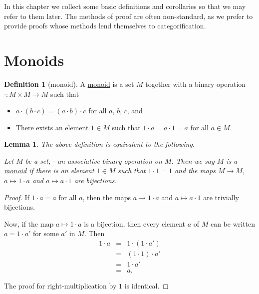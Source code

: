 \documentclass[a4paper,10pt]{scrreprt}
\newcommand{\defn}[1]{\ul{#1}}
\theoremstyle{definition}
\newtheorem{definition}{Definition}[section]
\theoremstyle{plain}
\newtheorem{lemma}{Lemma}[section]
\theoremstyle{remark}
\begin{document}
In this chapter we collect some basic definitions and corollaries so that we may refer to them later. The methods of proof are often non-standard, as we prefer to provide proofs whose methods lend themselves to categorification.
\section{Monoids}
\begin{definition}[monoid]
  \label{def:monoid}
  A \defn{monoid} is a set $M$ together with a binary operation $\cdot\colon M \times M \to M$ such that
  \begin{itemize}
    \item $a \cdot (b \cdot c)=(a \cdot b) \cdot c$ for all $a$, $b$, $c$, and
    \item There exists an element $1 \in M$ such that $1 \cdot a=a \cdot 1=a$ for all $a \in M$.
  \end{itemize}
\end{definition}

\begin{lemma}
  \label{lemma:monoidalmultiplicationbyunitbijective}
  The above definition is equivalent to the following.

  Let $M$ be a set, $\cdot$ an associative binary operation on $M$. Then we say $M$ is a \defn{monoid} if there is an element $1 \in M$ such that $1\cdot 1 = 1$ and the maps $M \to M$, $a \mapsto 1 \cdot a$ and $ a \mapsto a \cdot 1$ are bijections.
\end{lemma}
\begin{proof}
  If $1 \cdot a = a$ for all $a$, then the maps $a \to 1\cdot a$ and $a \mapsto a \cdot 1$ are trivially bijections.

  Now, if the map $a \mapsto 1 \cdot a$ is a bijection, then every element $a$ of $M$ can be written $a = 1 \cdot a'$ for some $a'$ in $M$. Then
  \begin{eqnarray*}
    1 \cdot a &=& 1 \cdot (1 \cdot a') \\
    &=& (1 \cdot 1) \cdot a' \\
    &=& 1 \cdot a' \\
    &=& a.
  \end{eqnarray*}

  The proof for right-multiplication by $1$ is identical.
\end{proof}
\end{document}
